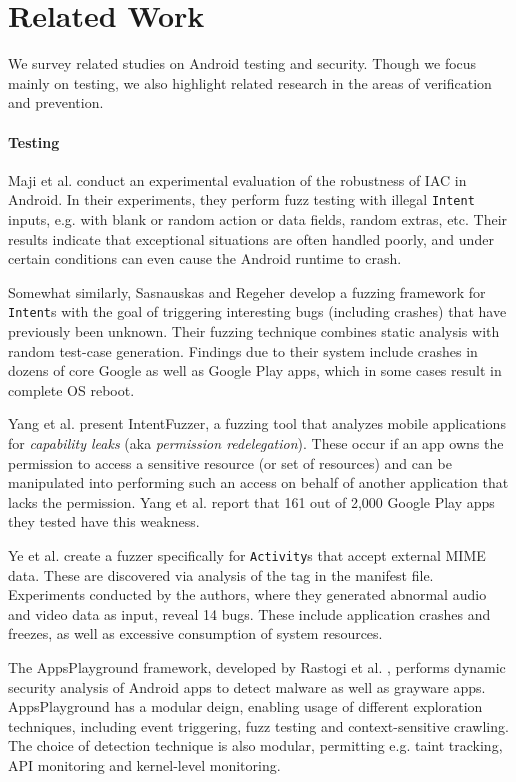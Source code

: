 \section{Related Work}\label{Se:related}

We survey related studies on Android testing and security. Though we  focus mainly on testing, we also highlight related research in the areas of verification and prevention.

\paragraph{Testing} Maji et al. \cite{MAB:DSN12} conduct an experimental evaluation of the robustness of IAC in Android. In their experiments, they perform fuzz testing with illegal {\tt Intent} inputs, e.g. with blank or random action or data fields, random extras, etc. Their results indicate that exceptional situations are often handled poorly, and under certain conditions can even cause the Android runtime to crash.

Somewhat similarly, Sasnauskas and Regeher \cite{SR:WODA14} develop a fuzzing framework for {\tt Intent}s with the goal of triggering interesting bugs (including crashes) that have previously been unknown. Their fuzzing technique combines static analysis with random test-case generation. Findings due to their system include crashes in dozens of core Google as well as Google Play apps, which in some cases result in complete OS reboot.

Yang et al. \cite{YZWZD:ACCS14} present IntentFuzzer, a fuzzing tool that analyzes mobile applications for \emph{capability leaks} (aka \emph{permission redelegation}). These occur if an app owns the permission to access a sensitive resource (or set of resources) and can be manipulated into performing such an access on behalf of another application that lacks the permission. Yang et al. report that 161 out of 2,000 Google Play apps they tested have this weakness.

Ye et al. \cite{YCZJ:MOMM13} create a fuzzer specifically for {\tt Activity}s that accept external MIME data. These are discovered via analysis of the {\tt <intent-filter>} tag in the manifest file. Experiments conducted by the authors, where they generated abnormal audio and video data as input, reveal 14 bugs. These include application crashes and freezes, as well as excessive consumption of system resources.

The AppsPlayground framework, developed by Rastogi et al. \cite{RCE:CODAPSY13}, performs dynamic security analysis of Android apps to detect malware as well as grayware apps.  AppsPlayground has a modular deign, enabling usage of different exploration techniques, including event triggering, fuzz testing and context-sensitive crawling. The choice of detection technique is also modular, permitting e.g. taint tracking, API monitoring and kernel-level monitoring. 

